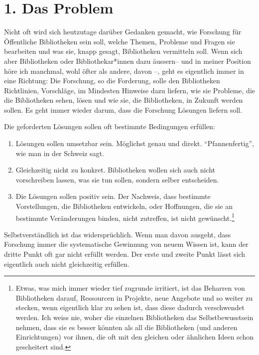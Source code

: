 \documentclass[a4paper,
fontsize=11pt,
oneside,
numbers=noperiodatend,
parskip=half-,
bibliography=totoc,
final
]{scrartcl}
\begin{document}
\hypertarget{das-problem}{%
\section{1. Das Problem}\label{das-problem}}

Nicht oft wird sich heutzutage darüber Gedanken gemacht, wie Forschung
für Öffentliche Bibliotheken sein soll, welche Themen, Probleme und
Fragen sie bearbeiten und was sie, knapp gesagt, Bibliotheken vermitteln
soll. Wenn sich aber Bibliotheken oder Bibliothekar*innen dazu äussern--
und in meiner Position höre ich manchmal, wohl öfter als andere, davon
--, geht es eigentlich immer in eine Richtung: Die Forschung, so die
Forderung, solle den Bibliotheken Richtlinien, Vorschläge, im Mindesten
Hinweise dazu liefern, wie sie Probleme, die die Bibliotheken sehen,
lösen und wie sie, die Bibliotheken, in Zukunft werden sollen. Es geht
immer wieder darum, dass die Forschung Lösungen liefern soll.

Die geforderten Lösungen sollen oft bestimmte Bedingungen erfüllen:

\begin{enumerate}
\def\labelenumi{(\arabic{enumi})}
\item
  Lösungen sollen umsetzbar sein. Möglichst genau und direkt.
  \enquote{Pfannenfertig}, wie man in der Schweiz sagt.
\item
  Gleichzeitig nicht zu konkret. Bibliotheken wollen sich auch nicht
  vorschreiben lassen, was sie tun sollen, sondern selber entscheiden.
\item
  Die Lösungen sollen positiv sein. Der Nachweis, dass bestimmte
  Vorstellungen, die Bibliotheken entwickeln, oder Hoffnungen, die sie
  an bestimmte Veränderungen binden, nicht zutreffen, ist nicht
  gewünscht.\footnote{Etwas, was mich immer wieder tief zugrunde
    irritiert, ist das Beharren von Bibliotheken darauf, Ressourcen in
    Projekte, neue Angebote und so weiter zu stecken, wenn eigentlich
    klar zu sehen ist, dass diese dadurch verschwendet werden. Ich weiss
    nie, woher die einzelnen Bibliotheken das Selbstbewusstsein nehmen,
    dass sie es besser könnten als all die Bibliotheken (und anderen
    Einrichtungen) vor ihnen, die oft mit den gleichen oder ähnlichen
    Ideen schon gescheitert sind.}
\end{enumerate}

Selbstverständlich ist das widersprüchlich. Wenn man davon ausgeht, dass
Forschung immer die systematische Gewinnung von neuem Wissen ist, kann
der dritte Punkt oft gar nicht erfüllt werden. Der erste und zweite
Punkt lässt sich eigentlich auch nicht gleichzeitig erfüllen.
\end{document}
